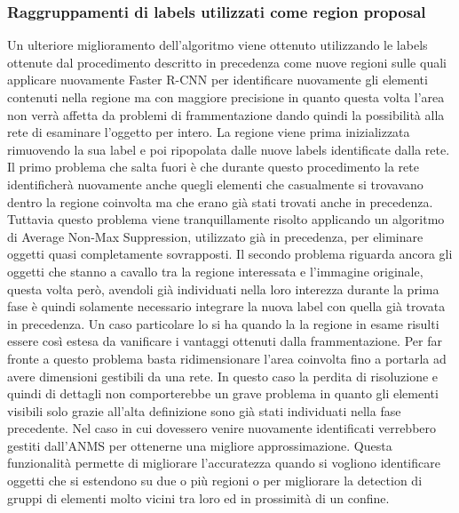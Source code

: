 \subsubsection{Raggruppamenti di labels utilizzati come region proposal}
Un ulteriore miglioramento dell'algoritmo viene ottenuto utilizzando le labels ottenute dal procedimento descritto in precedenza come nuove regioni sulle quali applicare nuovamente Faster R-CNN per identificare nuovamente gli elementi contenuti nella regione ma con maggiore precisione in quanto questa volta l'area non verrà affetta da problemi di frammentazione dando quindi la possibilità alla rete di esaminare l'oggetto per intero. La regione viene prima inizializzata rimuovendo la sua label e poi ripopolata dalle nuove labels identificate dalla rete.
Il primo problema che salta fuori è che durante questo procedimento la rete identificherà nuovamente anche quegli elementi che casualmente si trovavano dentro la regione coinvolta ma che erano già stati trovati anche in precedenza. Tuttavia questo problema viene tranquillamente risolto applicando un algoritmo di Average Non-Max Suppression, utilizzato già in precedenza, per eliminare oggetti quasi completamente sovrapposti. Il secondo problema riguarda ancora gli oggetti che stanno a cavallo tra la regione interessata e l'immagine originale, questa volta però, avendoli già individuati nella loro interezza durante la prima fase è quindi solamente necessario integrare la nuova label con quella già trovata in precedenza. 
Un caso particolare lo si ha quando la la regione in esame risulti essere così estesa da vanificare i vantaggi ottenuti dalla frammentazione. Per far fronte a questo problema basta ridimensionare l'area coinvolta fino a portarla ad avere dimensioni gestibili da una rete. In questo caso la perdita di risoluzione e quindi di dettagli non comporterebbe un grave problema in quanto gli elementi visibili solo grazie all'alta definizione sono già stati individuati nella fase precedente. Nel caso in cui dovessero venire nuovamente identificati verrebbero gestiti dall'ANMS per ottenerne una migliore approssimazione. Questa funzionalità permette di migliorare l'accuratezza quando si vogliono identificare oggetti che si estendono su due o più regioni o per migliorare la detection di gruppi di elementi molto vicini tra loro ed in prossimità di un confine. 


